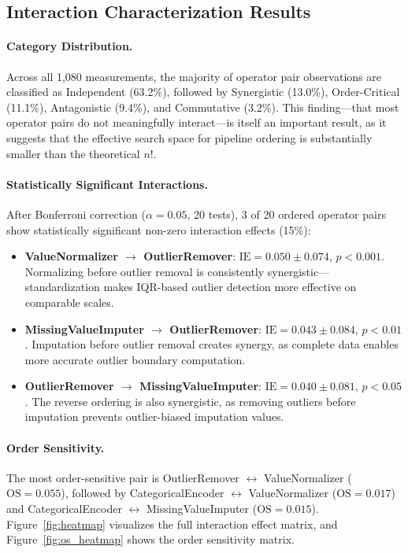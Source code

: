 \documentclass[preprint]{article}
\newcommand{\ie}{\text{IE}}
\newcommand{\os}{\text{OS}}
\begin{document}
\subsection{Interaction Characterization Results}

\paragraph{Category Distribution.} Across all 1,080 measurements, the majority of operator pair observations are classified as Independent (63.2\%), followed by Synergistic (13.0\%), Order-Critical (11.1\%), Antagonistic (9.4\%), and Commutative (3.2\%). This finding---that most operator pairs do not meaningfully interact---is itself an important result, as it suggests that the effective search space for pipeline ordering is substantially smaller than the theoretical $n!$.

\paragraph{Statistically Significant Interactions.} After Bonferroni correction ($\alpha = 0.05$, 20 tests), 3 of 20 ordered operator pairs show statistically significant non-zero interaction effects (15\%):
\begin{itemize}[nosep]
\item \textbf{ValueNormalizer $\rightarrow$ OutlierRemover}: $\ie = 0.050 \pm 0.074$, $p < 0.001$. Normalizing before outlier removal is consistently synergistic---standardization makes IQR-based outlier detection more effective on comparable scales.
\item \textbf{MissingValueImputer $\rightarrow$ OutlierRemover}: $\ie = 0.043 \pm 0.084$, $p < 0.01$. Imputation before outlier removal creates synergy, as complete data enables more accurate outlier boundary computation.
\item \textbf{OutlierRemover $\rightarrow$ MissingValueImputer}: $\ie = 0.040 \pm 0.081$, $p < 0.05$. The reverse ordering is also synergistic, as removing outliers before imputation prevents outlier-biased imputation values.
\end{itemize}

\paragraph{Order Sensitivity.} The most order-sensitive pair is OutlierRemover $\leftrightarrow$ ValueNormalizer ($\os = 0.055$), followed by CategoricalEncoder $\leftrightarrow$ ValueNormalizer ($\os = 0.017$) and CategoricalEncoder $\leftrightarrow$ MissingValueImputer ($\os = 0.015$). Figure~\ref{fig:heatmap} visualizes the full interaction effect matrix, and Figure~\ref{fig:os_heatmap} shows the order sensitivity matrix.
\end{document}
